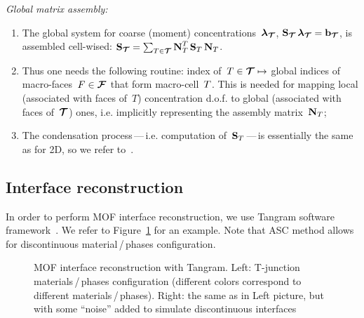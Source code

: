 \textit{Global matrix assembly:}
\begin{enumerate}
	\item The global system for coarse (moment) concentrations~$\boldsymbol{\mathbf{\lambda}}_{{\boldsymbol{\mathbf{\mathcal T}}}}$, $\boldsymbol{\mathbf{S}}_{{\boldsymbol{\mathbf{\mathcal T}}}}\,\boldsymbol{\mathbf{\lambda}}_{{\boldsymbol{\mathbf{\mathcal T}}}} = \boldsymbol{\mathbf{b}}_{{\boldsymbol{\mathbf{\mathcal T}}}}$, is assembled cell-wised: $\boldsymbol{\mathbf{S}}_{{\boldsymbol{\mathbf{\mathcal T}}}} = \sum_{T \in {\boldsymbol{\mathbf{\mathcal T}}}} \boldsymbol{\mathbf{N}}_T^T\,\boldsymbol{\mathbf{S}}_T\,\boldsymbol{\mathbf{N}}_T$.
	\item Thus one needs the following routine: index of~$T \in {\boldsymbol{\mathbf{\mathcal T}}} \mapsto$ global indices of macro-faces~$F \in {\boldsymbol{\mathbf{\mathcal F}}_{\text{}}}$ that form macro-cell~$T$. This is needed for mapping local (associated with faces of~$T$) concentration d.o.f. to global (associated with faces of~${\boldsymbol{\mathbf{\mathcal T}}}$) ones, i.e. implicitly representing the assembly matrix~$\boldsymbol{\mathbf{N}}_T$;
	\item The condensation process\,---\,i.e. computation of~$\boldsymbol{\mathbf{S}}_T$\,---\,is essentially the same as for 2D, so we refer to~\cite[p.~7]{ZHILIAKOV2019333}.
\end{enumerate}

\subsection{Interface reconstruction} 

In order to perform MOF interface reconstruction, we use Tangram software framework~\cite{tangram}. We refer to Figure~\ref{fig:tangram} for an example. Note that ASC method allows for discontinuous material\,/\,phases configuration.

\begin{figure}[H]
	\centering
	\begin{subfigure}{.1\linewidth}\end{subfigure}%
	\begin{subfigure}{.4\linewidth}
		\centering
	\end{subfigure}%
	\begin{subfigure}{.4\linewidth}
		\centering
	\end{subfigure}%
	\begin{subfigure}{.1\linewidth}\end{subfigure}%
	\caption{MOF interface reconstruction with Tangram. Left: T-junction materials\,/\,phases configuration (different colors correspond to different materials\,/\,phases). Right: the same as in Left picture, but with some ``noise'' added to simulate discontinuous interfaces}
	\label{fig:tangram}		
\end{figure}

